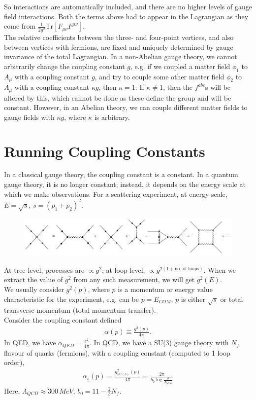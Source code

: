 \documentclass[relqm.tex]{subfiles}
\begin{document}
So interactions are automatically included, and there are no higher levels of gauge field interactions. 
Both the terms above had to appear in the Lagrangian as they come from $\frac{1}{2g^2}\text{Tr}[F_{\mu\nu}F^{\mu\nu}]$.\\
The relative coefficients between the three- and four-point vertices, and also between vertices with fermions, are fixed and uniquely determined by gauge invariance of the total Lagrangian. 
In a non-Abelian gauge theory, we cannot arbitrarily change the coupling constant $g$, e.g. if we coupled a matter field $\phi_1$ to $A_\mu$ with a coupling constant $g$, and try to couple some other matter field $\phi_2$ to $A_\mu$ with a coupling constant $\kappa g$, then $\kappa=1$.
If $\kappa\neq1$, then the $f^{abc}$s will be altered by this, which cannot be done as these define the group and will be constant. 
However, in an Abelian theory, we can couple different matter fields to gauge fields with $\kappa g$, where $\kappa$ is arbitrary. 

\section{Running Coupling Constants}
In a classical gauge theory, the coupling constant is a constant.
In a quantum gauge theory, it is no longer constant; instead, it depends on the energy scale at which we make observations. 
For a scattering experiment, at energy scale, $E = \sqrt{s}$, $s=(p_1+p_2)^2$.
\begin{figure}[H]
    \centering
    \includegraphics[scale=0.5]{diagrams/loopsum.png}
\end{figure}
At tree level, processes are $\propto g^2$; at loop level, $\propto g^{2(1+\text{no. of loops})}$.
When we extract the value of $g^2$ from any such measurement, we will get $g^2(E)$.\\
We usually consider $g^2(p)$, where $p$ is a momentum or energy value characteristic for the experiment, e.g. can be $p=E_{COM}$, $p$ is either $\sqrt{s}$ or total transverse momentum (total momentum transfer).\\
Consider the coupling constant defined
\begin{align}
    \alpha(p) \equiv \frac{g^2(p)}{4\pi}.
\end{align}
In QED, we have $\alpha_{QED}=\frac{e^2}{4\pi}$.
In QCD, we have a SU(3) gauge theory with $N_f$ flavour of quarks (fermions), with a coupling constant (computed to 1 loop order),
\begin{align}
    \alpha_s(p) = \frac{g^2_{SU(3)}(p)}{4\pi} = \frac{2\pi}{b_0\log\frac{p}{\Lambda_{QCD}}}
\end{align}
Here, $\Lambda_{QCD}\approx300\,MeV$, $b_0=11-\frac23 N_f$. 
\end{document}
